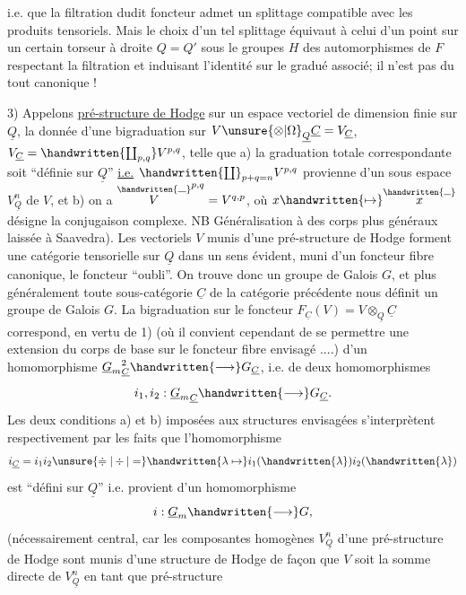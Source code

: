 %
i.e. que la filtration dudit foncteur admet un splittage compatible avec les produits tensoriels. Mais le choix d'un tel splittage équivaut à celui d'un point  sur un certain torseur à droite $Q=Q'$ sous le  groupes  $H$ des automorphismes de $F$ respectant la filtration et induisant l'identité sur le gradué associé; il n'est pas du tout canonique !

3) Appelons \uline{pré-structure de Hodge} sur un espace vectoriel  de dimension finie sur $\underline{Q}$, la donnée d'une bigraduation sur $V\unsure{\otimes|\Omega}_{\underline{Q}}\underline{C}=V_{\underline{C}}$, $V_{\underline{C}}=\handwritten{\coprod_{p,q}}V^{p,q}$, telle que a) la graduation totale correspondante soit ``définie sur $\underline{Q}$'' \uline{i.e.} $\handwritten{\coprod}_{p+q=n}V^{p,q}$ provienne d'un sous espace $V_{\underline{Q}}^n$ de $V$, et b) on a $\overset{\handwritten{\rule{.65em}{.35pt}}}{V}^{p,q}=V^{q,p}$, où $x\handwritten{\mapsto}\overset{\handwritten{\rule{.55em}{.35pt}}}{x}$ désigne la conjugaison complexe. \unsure{(}NB Généralisation à des corps plus généraux laissée à Saavedra). Les vectoriels $V$ munis d'une pré-structure de Hodge forment une catégorie tensorielle sur $\underline{Q}$ dans un sens évident, muni d'un foncteur fibre canonique, le foncteur ``oubli''. On trouve donc un groupe de Galois $G$, et  plus généralement toute \inserted{$\otimes$-}sous-catégorie $\underline{C}$ de la catégorie précédente nous définit un groupe de Galois $G$. La bigraduation sur le foncteur  $F_{\underline{C}}(V)=V\otimes_{\underline{Q}}\underline{C}$ correspond, en vertu de 1) (où il convient cependant de se permettre une extension du corps de base sur le foncteur fibre envisagé ....) d'un homomorphisme ${\underline{G}_m}_{\underline{C}}^2\handwritten{\longrightarrow}G_{\underline{C}}$, i.e. de deux homomorphismes 
\[
i_1,i_2:{\underline{G}_m}_{\underline{C}}\handwritten{\longrightarrow}G_{\underline{C}}.
\]
Les deux conditions a) et b) imposées aux structures envisagées s'interprètent respectivement par les faits que l'homomorphisme
\[
i_{\underline{C}}=i_1i_2\unsure{\doteqdot|\div|=}\handwritten{\lambda\mapsto}i_1(\handwritten{\lambda})i_2(\handwritten{\lambda})
\]
est ``défini sur $\underline{Q}$'' i.e. provient d'un homomorphisme
\[
i:\underline{G}_m\handwritten{\longrightarrow}G,
\]
(nécessairement central, car les composantes homogènes $V_{\underline{Q}}^n$ d'une pré-structure de Hodge sont  munis d'une structure de Hodge de façon que $V$ soit la somme directe de $V_{\underline{Q}}^n$ en tant que pré-structure
